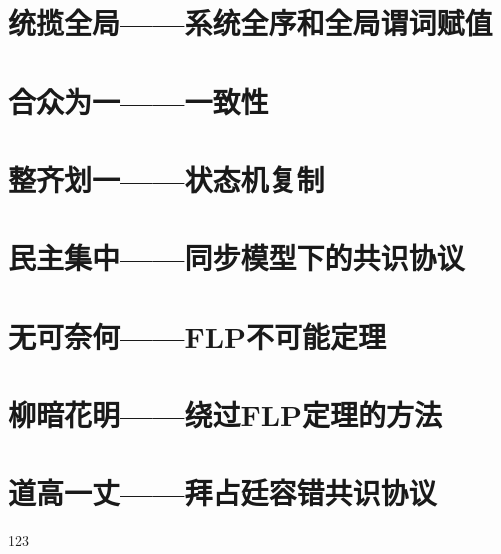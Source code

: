 \documentclass[UTF8,AutoFakeBold=1,AutoFakeSlant,zihao=-4]{cucthesis}
\begin{document}
\newpage

\section{统揽全局——系统全序和全局谓词赋值}

\newpage

\section{合众为一——一致性}

\newpage

\section{整齐划一——状态机复制}

\newpage

\section{民主集中——同步模型下的共识协议}

\newpage

\section{无可奈何——FLP不可能定理}

\newpage

\section{柳暗花明——绕过FLP定理的方法}

\newpage

\section{道高一丈——拜占廷容错共识协议}


\begin{references}
    
\end{references}


123
\end{document}
